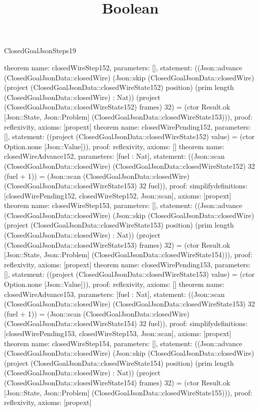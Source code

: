 \begin{lexlean}{ClosedGoalJsonSteps19}
\title{Boolean}
\begin{semanticmodule}
theorem{
 name: closedWireStep152, parameters: [],
 statement: ((Json::advance (ClosedGoalJsonData::closedWire) (Json::skip (ClosedGoalJsonData::closedWire) (project (ClosedGoalJsonData::closedWireState152) position) (prim length (ClosedGoalJsonData::closedWire) : Nat)) (project (ClosedGoalJsonData::closedWireState152) frames) 32) = (ctor Result.ok [Json::State, Json::Problem] (ClosedGoalJsonData::closedWireState153))), proof: reflexivity{}, axioms: [propext]
}
theorem{
 name: closedWirePending152, parameters: [],
 statement: ((project (ClosedGoalJsonData::closedWireState152) value) = (ctor Option.none [Json::Value])), proof: reflexivity{}, axioms: []
}
theorem{
 name: closedWireAdvance152, parameters: [fuel : Nat],
 statement: ((Json::scan (ClosedGoalJsonData::closedWire) (ClosedGoalJsonData::closedWireState152) 32 (fuel + 1)) = (Json::scan (ClosedGoalJsonData::closedWire) (ClosedGoalJsonData::closedWireState153) 32 fuel)), proof: simplify{definitions: [closedWirePending152, closedWireStep152, Json::scan]}, axioms: [propext]
}
theorem{
 name: closedWireStep153, parameters: [],
 statement: ((Json::advance (ClosedGoalJsonData::closedWire) (Json::skip (ClosedGoalJsonData::closedWire) (project (ClosedGoalJsonData::closedWireState153) position) (prim length (ClosedGoalJsonData::closedWire) : Nat)) (project (ClosedGoalJsonData::closedWireState153) frames) 32) = (ctor Result.ok [Json::State, Json::Problem] (ClosedGoalJsonData::closedWireState154))), proof: reflexivity{}, axioms: [propext]
}
theorem{
 name: closedWirePending153, parameters: [],
 statement: ((project (ClosedGoalJsonData::closedWireState153) value) = (ctor Option.none [Json::Value])), proof: reflexivity{}, axioms: []
}
theorem{
 name: closedWireAdvance153, parameters: [fuel : Nat],
 statement: ((Json::scan (ClosedGoalJsonData::closedWire) (ClosedGoalJsonData::closedWireState153) 32 (fuel + 1)) = (Json::scan (ClosedGoalJsonData::closedWire) (ClosedGoalJsonData::closedWireState154) 32 fuel)), proof: simplify{definitions: [closedWirePending153, closedWireStep153, Json::scan]}, axioms: [propext]
}
theorem{
 name: closedWireStep154, parameters: [],
 statement: ((Json::advance (ClosedGoalJsonData::closedWire) (Json::skip (ClosedGoalJsonData::closedWire) (project (ClosedGoalJsonData::closedWireState154) position) (prim length (ClosedGoalJsonData::closedWire) : Nat)) (project (ClosedGoalJsonData::closedWireState154) frames) 32) = (ctor Result.ok [Json::State, Json::Problem] (ClosedGoalJsonData::closedWireState155))), proof: reflexivity{}, axioms: [propext]
}
\end{semanticmodule}
\end{lexlean}
